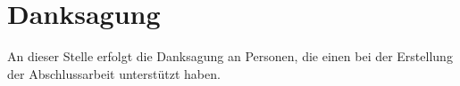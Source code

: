 \section*{Danksagung}
An dieser Stelle erfolgt die Danksagung an Personen, die einen bei der Erstellung der Abschlussarbeit unterstützt haben.